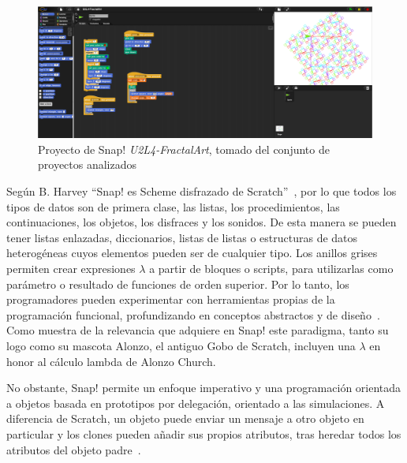 \documentclass[a4paper, 12pt]{book}
\begin{document}
\begin{figure}[H]
    \centering
    \includegraphics[width=1\textwidth]{img/proy_Snap.png}
    \caption{Proyecto de Snap! \emph{U2L4-FractalArt}, tomado del conjunto de proyectos analizados}
    \label{fig:fractal}
\end{figure}

Según B. Harvey ``Snap! es Scheme disfrazado de Scratch''~\cite[p. 3]{harvey2017snap}, por lo que todos los tipos de datos son de primera clase, las listas, los procedimientos, las continuaciones, los objetos, los disfraces y los sonidos. De esta manera se pueden tener listas enlazadas, diccionarios, listas de listas o estructuras de datos heterogéneas cuyos elementos pueden ser de cualquier tipo. Los anillos grises permiten crear expresiones $\lambda$ a partir de bloques o scripts, para utilizarlas como parámetro o resultado de funciones de orden superior.
Por lo tanto, los programadores pueden experimentar con herramientas propias de la programación funcional, profundizando en conceptos abstractos y de diseño~\cite{harvey2015lambda}.
Como muestra de la relevancia que adquiere en Snap! este paradigma, tanto su logo como su mascota Alonzo, el antiguo Gobo de Scratch, incluyen una $\lambda$ en honor al cálculo lambda de Alonzo Church.

No obstante, Snap! permite un enfoque imperativo y una programación orientada a objetos basada en prototipos por delegación, orientado a las simulaciones. A diferencia de Scratch, un objeto puede enviar un mensaje a otro objeto en particular y los clones pueden añadir sus propios atributos, tras heredar todos los atributos del objeto padre~\cite{snap2022git}. %
\end{document}
